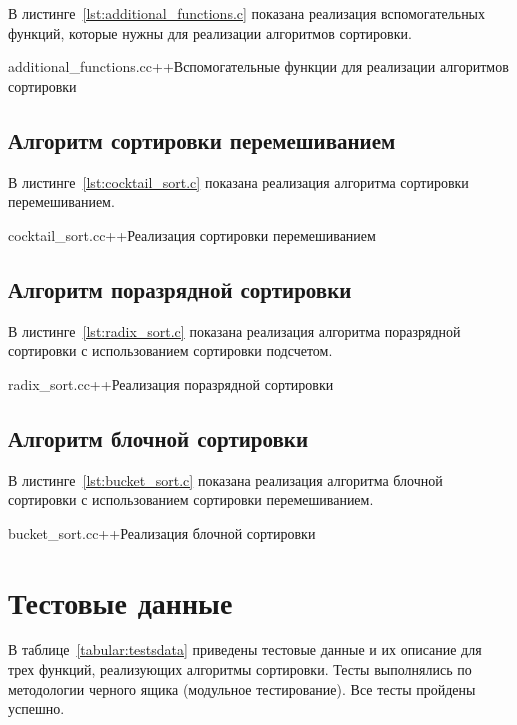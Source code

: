 В листинге~\ref{lst:additional_functions.c} показана реализация вспомогательных функций, которые нужны для реализации алгоритмов сортировки.

{additional_functions.c}{c++}{Вспомогательные функции для реализации алгоритмов сортировки}

\subsection{Алгоритм сортировки перемешиванием}

В листинге~\ref{lst:cocktail_sort.c} показана реализация алгоритма сортировки перемешиванием.

{cocktail_sort.c}{c++}{Реализация сортировки перемешиванием}

\subsection{Алгоритм поразрядной сортировки}

В листинге~\ref{lst:radix_sort.c} показана реализация алгоритма поразрядной сортировки с использованием сортировки подсчетом.

{radix_sort.c}{c++}{Реализация поразрядной сортировки}

\subsection{Алгоритм блочной сортировки}

В листинге~\ref{lst:bucket_sort.c} показана реализация алгоритма блочной сортировки с использованием сортировки перемешиванием.

{bucket_sort.c}{c++}{Реализация блочной сортировки}

\section{Тестовые данные}

В таблице~\ref{tabular:testsdata} приведены тестовые данные и их описание для трех функций, реализующих алгоритмы сортировки. 
Тесты выполнялись по методологии черного ящика (модульное тестирование). 
Все тесты пройдены успешно.

